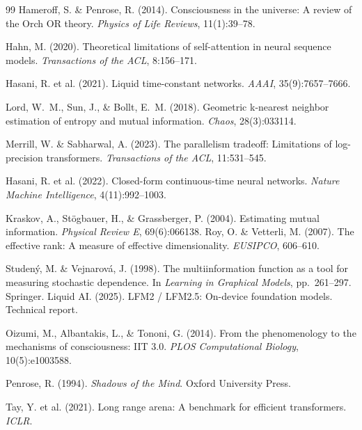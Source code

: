 \documentclass[11pt]{article}
\theoremstyle{definition}
\begin{document}
\begin{thebibliography}{99}
Hameroff, S. \& Penrose, R. (2014). Consciousness in the universe: A review of the Orch OR theory. \textit{Physics of Life Reviews}, 11(1):39--78.

Hahn, M. (2020). Theoretical limitations of self-attention in neural sequence models. \textit{Transactions of the ACL}, 8:156--171.

Hasani, R. et al. (2021). Liquid time-constant networks. \textit{AAAI}, 35(9):7657--7666.

Lord, W.~M., Sun, J., \& Bollt, E.~M. (2018). Geometric k-nearest neighbor estimation of entropy and mutual information. \textit{Chaos}, 28(3):033114.

Merrill, W. \& Sabharwal, A. (2023). The parallelism tradeoff: Limitations of log-precision transformers. \textit{Transactions of the ACL}, 11:531--545.

Hasani, R. et al. (2022). Closed-form continuous-time neural networks. \textit{Nature Machine Intelligence}, 4(11):992--1003.

Kraskov, A., St{\"o}gbauer, H., \& Grassberger, P. (2004). Estimating mutual information. \textit{Physical Review E}, 69(6):066138.
Roy, O. \& Vetterli, M. (2007). The effective rank: A measure of effective dimensionality. \textit{EUSIPCO}, 606--610.

Studen{\'{y}}, M. \& Vejnarov{\'{a}}, J. (1998). The multiinformation function as a tool for measuring stochastic dependence. In \textit{Learning in Graphical Models}, pp.\ 261--297. Springer.
Liquid AI. (2025). LFM2 / LFM2.5: On-device foundation models. Technical report.

Oizumi, M., Albantakis, L., \& Tononi, G. (2014). From the phenomenology to the mechanisms of consciousness: IIT 3.0. \textit{PLOS Computational Biology}, 10(5):e1003588.

Penrose, R. (1994). \textit{Shadows of the Mind}. Oxford University Press.

Tay, Y. et al. (2021). Long range arena: A benchmark for efficient transformers. \textit{ICLR}.


\end{thebibliography}
\end{document}
